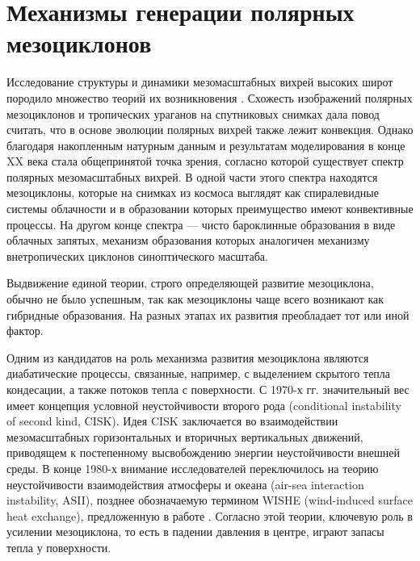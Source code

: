 \documentclass[12pt,a4paper]{report}
\begin{document}
\setcounter{chapter}{1}
\chapter{Механизмы генерации полярных мезоциклонов}
Исследование структуры и динамики мезомасштабных вихрей высоких широт породило множество теорий их возникновения \citep{RT2003}. Схожесть изображений полярных мезоциклонов и тропических ураганов на спутниковых снимках дала повод считать, что в основе эволюции полярных вихрей также лежит конвекция. Однако благодаря накопленным натурным данным и результатам моделирования в конце XX века стала общепринятой точка зрения, согласно которой существует спектр полярных мезомасштабных вихрей. В одной части этого спектра находятся мезоциклоны, которые на снимках из космоса выглядят как спиралевидные системы облачности и в образовании которых преимущество имеют конвективные процессы. На другом конце спектра --- чисто бароклинные образования в виде облачных запятых, механизм образования которых аналогичен механизму внетропических циклонов синоптического масштаба.

Выдвижение единой теории, строго определяющей развитие мезоциклона, обычно не было успешным, так как мезоциклоны чаще всего возникают как гибридные образования. На разных этапах их развития преобладает тот или иной фактор.

Одним из кандидатов на роль механизма развития мезоциклона являются диабатические процессы, связанные, например, с выделением скрытого тепла кондесации, а также потоков тепла с поверхности. С 1970-х гг. значительный вес имеет концепция условной неустойчивости второго рода (conditional instability of second kind, CISK). Идея CISK заключается во взаимодействии мезомасштабных горизонтальных и вторичных вертикальных движений, приводящем к постепенному высвобождению энергии неустойчивости внешней среды. В конце 1980-х внимание исследователей переключилось на теорию неустойчивости взаимодействия атмосферы и океана (air-sea interaction instability, ASII), позднее обозначаемую термином WISHE (wind-induced surface heat exchange), предложенную в работе \citep{EmanuelRotunno1989}. Согласно этой теории, ключевую роль в усилении мезоциклона, то есть в падении давления в центре, играют запасы тепла у поверхности.
\end{document}
